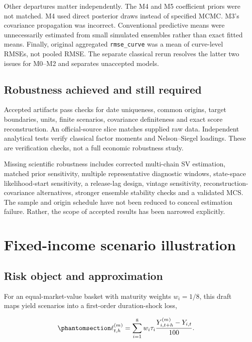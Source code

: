 \documentclass[
  12pt,
  letterpaper,
  DIV=11,
  numbers=noendperiod]{scrreprt}
\begin{document}
Other departures matter independently. The M4 and M5 coefficient priors
were not matched. M4 used direct posterior draws instead of specified
MCMC. M3's covariance propagation was incorrect. Conventional predictive
means were unnecessarily estimated from small simulated ensembles rather
than exact fitted means. Finally, original aggregated
\texttt{rmse\_curve} was a mean of curve-level RMSEs, not pooled RMSE.
The separate classical rerun resolves the latter two issues for M0--M2
and separates unaccepted models.

\section{Robustness achieved and still
required}\label{robustness-achieved-and-still-required}

Accepted artifacts pass checks for date uniqueness, common origins,
target boundaries, units, finite scenarios, covariance definiteness and
exact score reconstruction. An official-source slice matches supplied
raw data. Independent analytical tests verify classical factor moments
and Nelson--Siegel loadings. These are verification checks, not a full
economic robustness study.

Missing scientific robustness includes corrected multi-chain SV
estimation, matched prior sensitivity, multiple representative
diagnostic windows, state-space likelihood-start sensitivity, a
release-lag design, vintage sensitivity, reconstruction-covariance
alternatives, stronger ensemble stability checks and a validated MCS.
The sample and origin schedule have not been reduced to conceal
estimation failure. Rather, the scope of accepted results has been
narrowed explicitly.

\chapter{Fixed-income scenario illustration}\label{sec-risk}

\section{Risk object and
approximation}\label{risk-object-and-approximation}

For an equal-market-value basket with maturity weights \(w_i=1/8\), this
draft maps yield scenarios into a first-order duration-shock loss,

\begin{equation}\protect\phantomsection\label{eq-loss}{
\ell_{t,h}^{(m)}=\sum_{i=1}^8 w_i\tau_i\frac{Y_{i,t+h}^{(m)}-Y_{i,t}}{100}.
}\end{equation}
\end{document}
